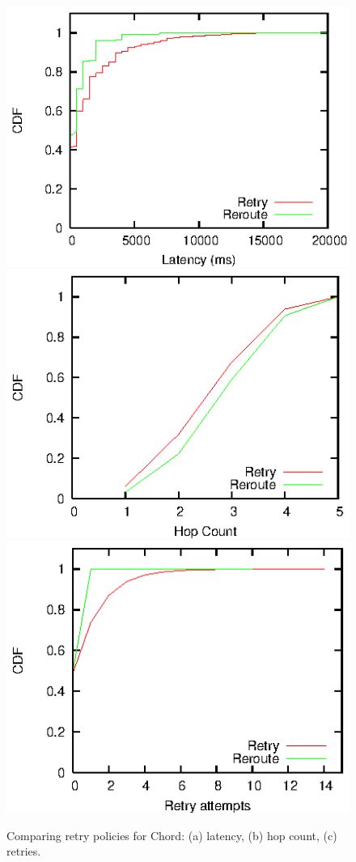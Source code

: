 \documentclass[10pt,twocolumn]{article}
\def\graphscale{.88}
\begin{document}
\begin{figure}[ht]
\centerline{\includegraphics[scale=\graphscale]{results/latencyCDF.eps}
\includegraphics[scale=\graphscale]{results/hopCDF.eps}
\includegraphics[scale=\graphscale]{results/retryCDF.eps}}
\caption{Comparing retry policies for Chord: (a) latency, (b) hop
  count, (c) retries.}
\label{fig:retry}
\end{figure}
\end{document}
